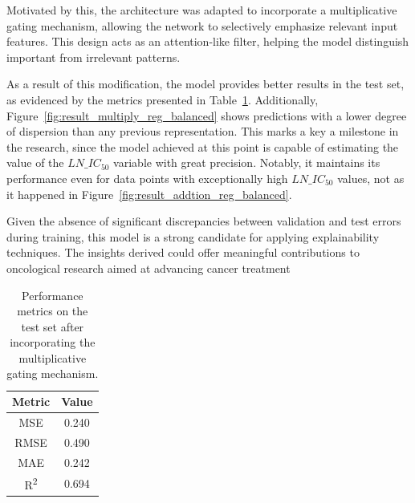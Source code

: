 Motivated by this, the architecture was adapted to incorporate a multiplicative gating mechanism, allowing the network to selectively emphasize relevant input features. This design acts as an attention-like filter, helping the model distinguish important from irrelevant patterns. 


As a result of this modification, the model provides better results in the test set, as evidenced by the metrics presented in Table~\ref{tab:metrics_multiplicative_gating}. Additionally, Figure~\ref{fig:result_multiply_reg_balanced} shows predictions with a lower degree of dispersion than any previous representation. This marks a key a milestone in the research, since the model achieved at this point is capable of estimating the value of the \(LN\_IC_{50}\) variable with great precision. Notably, it maintains its performance even for data points with exceptionally high \(LN\_IC_{50}\) values, not as it happened in Figure~\ref{fig:result_addtion_reg_balanced}. 

Given the absence of significant discrepancies between validation and test errors during training, this model is a strong candidate for applying explainability techniques. The insights derived could offer meaningful contributions to oncological research aimed at advancing cancer treatment

\begin{table}[H]
    \centering
    \begin{tabular}{|c|c|}
    \hline
    \textbf{Metric} & \textbf{Value} \\
    \hline
    MSE & 0.240 \\
    RMSE & 0.490 \\
    MAE & 0.242 \\
    R\textsuperscript{2} & 0.694 \\
    \hline
    \end{tabular}
    \caption{Performance metrics on the test set after incorporating the multiplicative gating mechanism.}
    \label{tab:metrics_multiplicative_gating}
\end{table}

